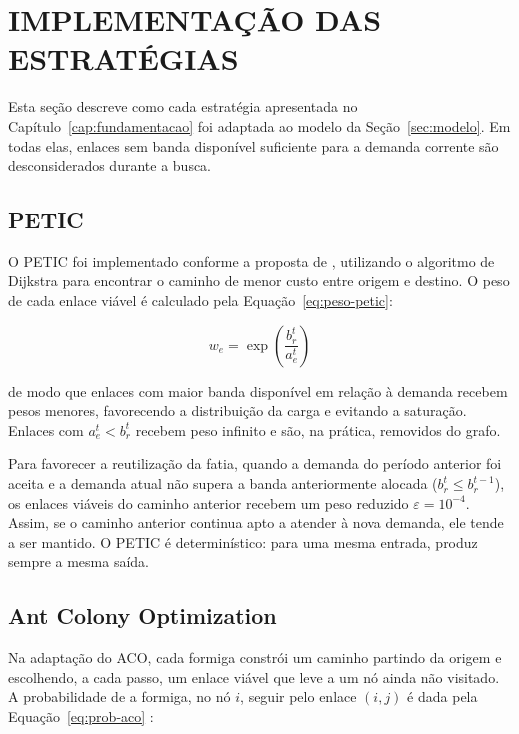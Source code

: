 \section{IMPLEMENTAÇÃO DAS ESTRATÉGIAS}
\label{sec:estrategias}

Esta seção descreve como cada estratégia apresentada no Capítulo~\ref{cap:fundamentacao} foi adaptada ao modelo da Seção~\ref{sec:modelo}. Em todas elas, enlaces sem banda disponível suficiente para a demanda corrente são desconsiderados durante a busca.

\subsection{PETIC}
\label{subsec:impl-petic}

O PETIC foi implementado conforme a proposta de , utilizando o algoritmo de Dijkstra para encontrar o caminho de menor custo entre origem e destino. O peso de cada enlace viável é calculado pela Equação~\ref{eq:peso-petic}:

\begin{equation}
    w_e = \exp\!\left(\frac{b_r^t}{a_e^t}\right)
    \label{eq:peso-petic}
\end{equation}

\noindent de modo que enlaces com maior banda disponível em relação à demanda recebem pesos menores, favorecendo a distribuição da carga e evitando a saturação. Enlaces com $a_e^t < b_r^t$ recebem peso infinito e são, na prática, removidos do grafo.

Para favorecer a reutilização da fatia, quando a demanda do período anterior foi aceita e a demanda atual não supera a banda anteriormente alocada ($b_r^{t} \leq b_r^{t-1}$), os enlaces viáveis do caminho anterior recebem um peso reduzido $\varepsilon = 10^{-4}$. Assim, se o caminho anterior continua apto a atender à nova demanda, ele tende a ser mantido. O PETIC é determinístico: para uma mesma entrada, produz sempre a mesma saída.

\subsection{Ant Colony Optimization}
\label{subsec:impl-aco}

Na adaptação do ACO, cada formiga constrói um caminho partindo da origem e escolhendo, a cada passo, um enlace viável que leve a um nó ainda não visitado. A probabilidade de a formiga, no nó $i$, seguir pelo enlace $(i, j)$ é dada pela Equação~\ref{eq:prob-aco} \cite{dorigo1999}:

